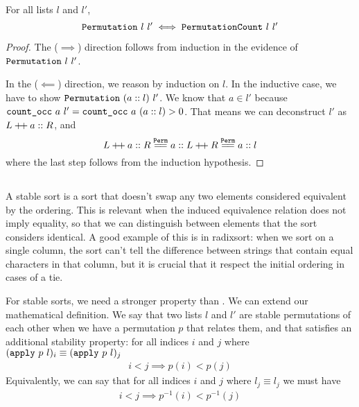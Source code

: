 \documentclass[11pt]{thesis}
\begin{document}
\begin{theorem}
  For all lists $l$ and $l'$,
  \begin{equation*}
    \texttt{Permutation}~l~l' \iff \texttt{PermutationCount}~l~l'
  \end{equation*}
\end{theorem}
\begin{proof}
  The ($\implies$) direction follows from induction in the evidence of
  $\texttt{Permutation}~l~l'$.

  In the ($\impliedby$) direction, we reason by induction on $l$. In
  the inductive case, we have to show $\texttt{Permutation}~(a::l)~l'$.
  We know that $a \in l'$ because $\texttt{count\_occ}~a~l' =
  \texttt{count\_occ}~a~(a::l) > 0$. That means we can deconstruct $l'$
  as $L \mathbin{+\mkern-3mu+} a :: R$, and
  \begin{equation*}
    L \dplus a :: R \eqperm a :: L \dplus R \eqperm a :: l
  \end{equation*}
  where the last step follows from the induction hypothesis.
\end{proof}

\subsection{}
\label{subsec:stable}

A stable sort is a sort that doesn't swap any two elements considered
equivalent by the ordering. This is relevant when the induced
equivalence relation does not imply equality, so that we can
distinguish between elements that the sort considers identical. A good
example of this is in radixsort: when we sort on a single column, the
sort can't tell the difference between strings that contain equal
characters in that column, but it is crucial that it respect the
initial ordering in cases of a tie.

For stable sorts, we need a stronger property than .
We can extend our mathematical definition. We say that two lists $l$
and $l'$ are stable permutations of each other when we have a
permutation $p$ that relates them, and that satisfies an additional
stability property: for all indices $i$ and $j$ where
$(\texttt{apply}~p~l)_i \equiv (\texttt{apply}~p~l)_j$
\begin{gather*}
  i < j \implies p(i) < p(j)
\end{gather*}
Equivalently, we can say that for all indices $i$ and $j$ where $l_j \equiv
l_j$ we must have
\begin{gather*}
  i < j \implies p^{-1}(i) < p^{-1}(j)
\end{gather*}
\end{document}
